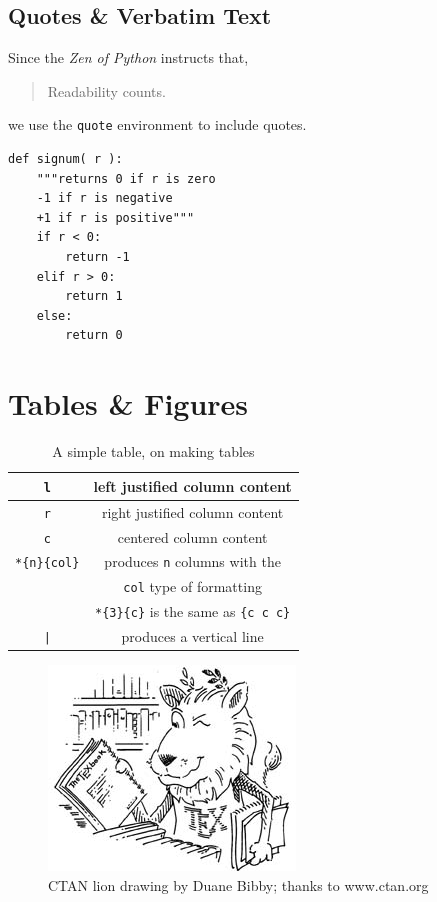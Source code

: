 \documentclass[11pt,a4paper,twoside]{article}
\begin{document}
\subsection{Quotes \& Verbatim Text}
Since the \emph{Zen of Python} instructs that, 
\begin{quote}
Readability counts.
\end{quote}
we use the \verb+quote+ environment to include quotes. 

\begin{verbatim}
def signum( r ):
    """returns 0 if r is zero
    -1 if r is negative
    +1 if r is positive"""
    if r < 0:
        return -1
    elif r > 0:
        return 1
    else:
        return 0
\end{verbatim}

\section{Tables \& Figures}

\begin{table}[h]
\caption{A simple table, on making tables}
\centering
\begin{tabular}{|c|c|}
  \hline
  \verb+l+ & left justified column content\\ 
  \hline
  \verb+r+ & right justified column content\\ 
  \hline
  \verb+c+ & centered column content\\ 
  \hline
  \verb+*{n}{col}+ & produces \verb+n+ columns with the\\
                   & \verb+col+ type of formatting\\
  \cline{2-2}
                   &\verb+*{3}{c}+ is the same as \verb+{c c c}+ \\
  \hline
  \verb+|+ & produces a vertical line\\ 
  \hline
\end{tabular}
\end{table}

\begin{figure}
\centering
\caption[CTAN Lion]{CTAN lion drawing by Duane Bibby; thanks to www.ctan.org}
\label{fig:lion}
\includegraphics[scale=0.8, angle=30]{lion_orig.png}
\end{figure}
\end{document}
